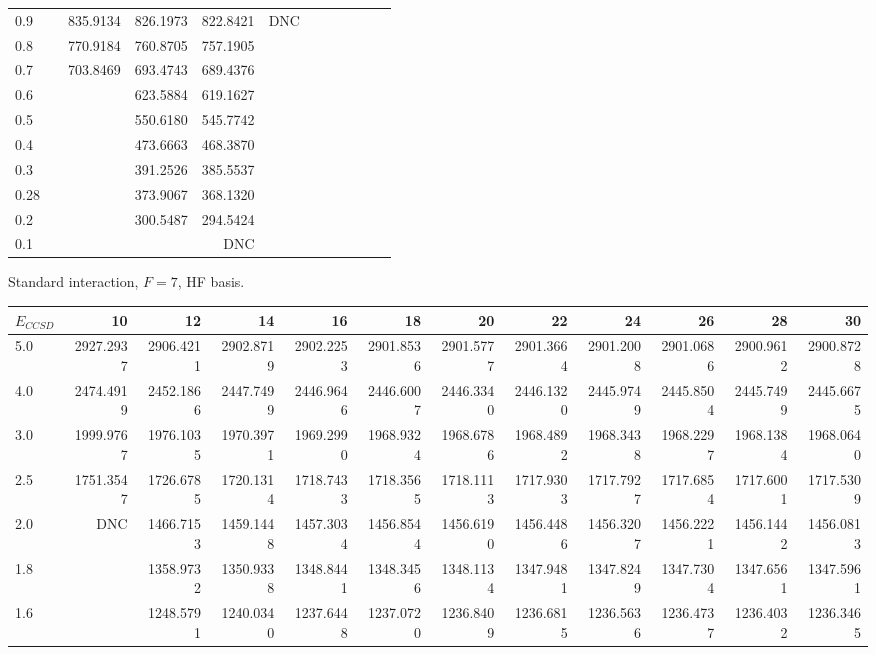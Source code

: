 \begin{landscape}
\begin{table}
\begin{small}
\begin{center}
\begin{tabular}{l|rrrrrrrrrrr}
0.9 & 			&  835.9134 &  826.1973 &  822.8421 &       DNC  \\ 
0.8 & 			& 770.9184 & 760.8705 & 757.1905  \\ 
0.7 & 			& 703.8469 & 693.4743 & 689.4376  \\ 
0.6 & 			& 			& 623.5884 & 619.1627  \\ 
0.5 & 			& 			& 550.6180 & 545.7742  \\ 
0.4 & 			& 			& 473.6663 & 468.3870  \\ 
0.3 & 			& 			& 391.2526 & 385.5537  \\ 
0.28 & 			& 			& 373.9067 & 368.1320  \\ 
0.2 & 			& 			& 300.5487 & 294.5424  \\ 
0.1 & 			& 			& 			& DNC  \\ 
\hline \hline
\end{tabular}
\end{center}
\end{small}
\end{table}
\begin{table}
\begin{small}
\begin{center}
Standard interaction, $F=7$, HF basis.\\
\begin{tabular}{l|rrrrrrrrrrr}
\hline 
$E_{CCSD}$ & 10 & 12 & 14 & 16 & 18 & 20 & 22 & 24 & 26 & 28 & 30 \\
\hline \hline
5.0 & 2927.2937 & 2906.4211 & 2902.8719 & 2902.2253 & 2901.8536 & 2901.5777 & 2901.3664 & 2901.2008 & 2901.0686 & 2900.9612 & 2900.8728 \\ 
4.0 & 2474.4919 & 2452.1866 & 2447.7499 & 2446.9646 & 2446.6007 & 2446.3340 & 2446.1320 & 2445.9749 & 2445.8504 & 2445.7499 & 2445.6675 \\ 
3.0 & 1999.9767 & 1976.1035 & 1970.3971 & 1969.2990 & 1968.9324 & 1968.6786 & 1968.4892 & 1968.3438 & 1968.2297 & 1968.1384 & 1968.0640 \\ 
2.5 & 1751.3547 & 1726.6785 & 1720.1314 & 1718.7433 & 1718.3565 & 1718.1113 & 1717.9303 & 1717.7927 & 1717.6854 & 1717.6001 & 1717.5309 \\ 
2.0 &       DNC & 1466.7153 & 1459.1448 & 1457.3034 & 1456.8544 & 1456.6190 & 1456.4486 & 1456.3207 & 1456.2221 & 1456.1442 & 1456.0813 \\ 
1.8 & 			& 1358.9732 & 1350.9338 & 1348.8441 & 1348.3456 & 1348.1134 & 1347.9481 & 1347.8249 & 1347.7304 & 1347.6561 & 1347.5961 \\ 
1.6 & 			& 1248.5791 & 1240.0340 & 1237.6448 & 1237.0720 & 1236.8409 & 1236.6815 & 1236.5636 & 1236.4737 & 1236.4032 & 1236.3465 \\ 

\end{tabular}
\end{center}
\end{small}
\end{table}
\end{landscape}
